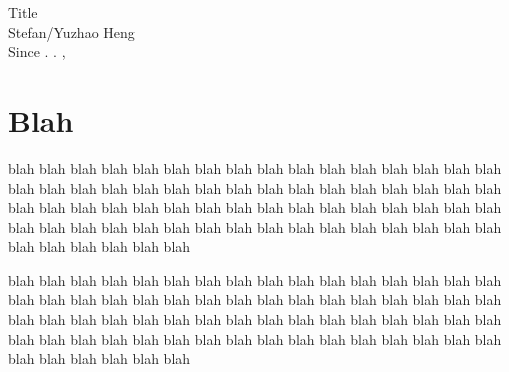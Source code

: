 \documentclass[12pt]{article}
\newlength\tindent
\renewcommand{\indent}{\hspace*{\tindent}}
\newcommand{\mydate}{\shortdayofweekname{\day}{\month}{\year}. \shortmonthname. \nth{\day}, \the\year{}}
\begin{document}
\begin{center}
    \Large Title \vspace{0.2cm} \\
    \large Stefan/Yuzhao Heng \vspace{0.2cm} \\
    \normalsize Since \mydate
\end{center}



\section*{Blah}
\indent
blah blah blah blah blah blah blah blah blah blah blah blah blah blah
blah blah blah blah blah blah blah blah blah blah blah blah blah blah
blah blah blah blah blah blah blah blah blah blah blah blah blah blah
blah blah blah blah blah blah blah blah blah blah blah blah blah blah
blah blah blah blah blah blah blah blah blah blah blah blah blah blah \par


\indent
blah blah blah blah blah blah blah blah blah blah blah blah blah blah
blah blah blah blah blah blah blah blah blah blah blah blah blah blah
blah blah blah blah blah blah blah blah blah blah blah blah blah blah
blah blah blah blah blah blah blah blah blah blah blah blah blah blah
blah blah blah blah blah blah blah blah blah blah blah blah blah blah \par
\end{document}
